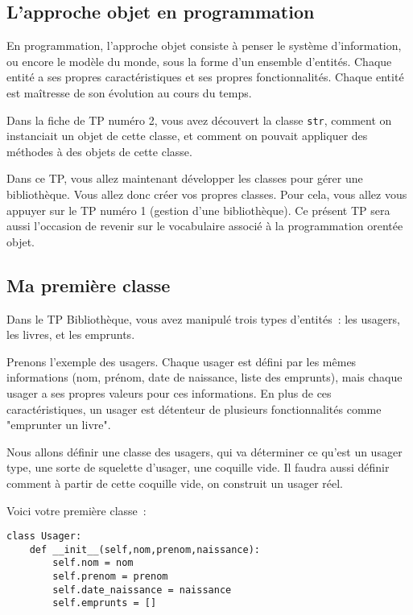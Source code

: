 \documentclass[10pt,a4paper]{sujets-exercices}
\begin{document}
\subsection*{L'approche objet en programmation}

En programmation, l'approche objet consiste à penser le système d'information, ou encore le modèle du monde, sous la forme d'un ensemble d'entités. Chaque entité a ses propres caractéristiques et ses propres fonctionnalités. Chaque entité est maîtresse de son évolution au cours du temps.

Dans la fiche de TP numéro 2, vous avez découvert la classe \texttt{str}, comment on instanciait un objet de cette classe, et comment on pouvait appliquer des méthodes à des objets de cette classe.

Dans ce TP, vous allez maintenant développer les classes pour gérer une bibliothèque. Vous allez donc créer vos propres classes. Pour cela, vous allez vous appuyer sur le TP numéro 1 (gestion d'une bibliothèque). Ce présent TP sera aussi l'occasion de revenir sur le vocabulaire associé à la programmation orentée objet.

\subsection*{Ma première classe}

Dans le TP Bibliothèque, vous avez manipulé trois types d'entités~: les usagers, les livres, et les emprunts.

Prenons l'exemple des usagers. Chaque usager est défini par les mêmes informations (nom, prénom, date de naissance, liste des emprunts), mais chaque usager a ses propres valeurs pour ces informations. En  plus de ces caractéristiques, un usager est détenteur de plusieurs fonctionnalités comme "emprunter un livre".

Nous allons définir une classe des usagers, qui va déterminer ce qu'est un usager type, une sorte de squelette d'usager, une coquille vide. Il faudra aussi définir comment à partir de cette coquille vide, on construit un usager réel.

Voici votre première classe~:

\begin{verbatim}
class Usager:
    def __init__(self,nom,prenom,naissance):
        self.nom = nom
        self.prenom = prenom
        self.date_naissance = naissance
        self.emprunts = []

\end{verbatim}  
\end{document}
